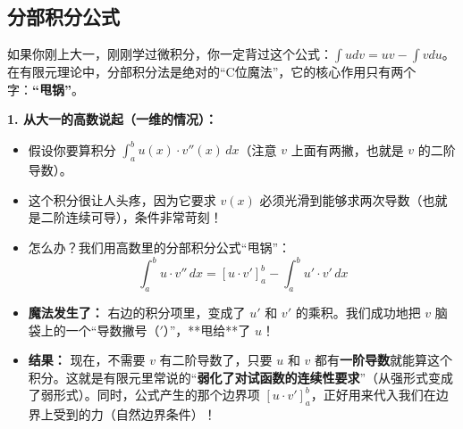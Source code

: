 \documentclass[11pt, a4paper, UTF8]{ctexart}
\begin{document}
\subsection{分部积分公式}
如果你刚上大一，刚刚学过微积分，你一定背过这个公式：$\int u dv = uv - \int v du$。
在有限元理论中，分部积分法是绝对的“C位魔法”，它的核心作用只有两个字：\textbf{“甩锅”}。

\textbf{1. 从大一的高数说起（一维的情况）：}
\begin{itemize}
    \item 假设你要算积分 $\int_{a}^{b} u(x) \cdot v''(x) \, dx$（注意 $v$ 上面有两撇，也就是 $v$ 的二阶导数）。
    \item 这个积分很让人头疼，因为它要求 $v(x)$ 必须光滑到能够求两次导数（也就是二阶连续可导），条件非常苛刻！
    \item 怎么办？我们用高数里的分部积分公式“甩锅”：
    \[ \int_{a}^{b} u \cdot v'' \, dx = \left[ u \cdot v' \right]_a^b - \int_{a}^{b} u' \cdot v' \, dx \]
    \item \textbf{魔法发生了：} 右边的积分项里，变成了 $u'$ 和 $v'$ 的乘积。我们成功地把 $v$ 脑袋上的一个“导数撇号（$'$）”，**甩给**了 $u$！
    \item \textbf{结果：} 现在，不需要 $v$ 有二阶导数了，只要 $u$ 和 $v$ 都有\textbf{一阶导数}就能算这个积分。这就是有限元里常说的“\textbf{弱化了对试函数的连续性要求}”（从强形式变成了弱形式）。同时，公式产生的那个边界项 $\left[ u \cdot v' \right]_a^b$，正好用来代入我们在边界上受到的力（自然边界条件）！
\end{itemize}
\end{document}
